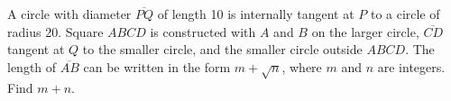 A circle with diameter $\overline{PQ}$ of length 10 is internally tangent at $P$ to a circle of radius 20. Square $ABCD$ is constructed with $A$ and $B$ on the larger circle, $\overline{CD}$ tangent at $Q$ to the smaller circle, and the smaller circle outside $ABCD$. The length of $\overline{AB}$ can be written in the form $m + \sqrt{n}$, where $m$ and $n$ are integers. Find $m + n$.